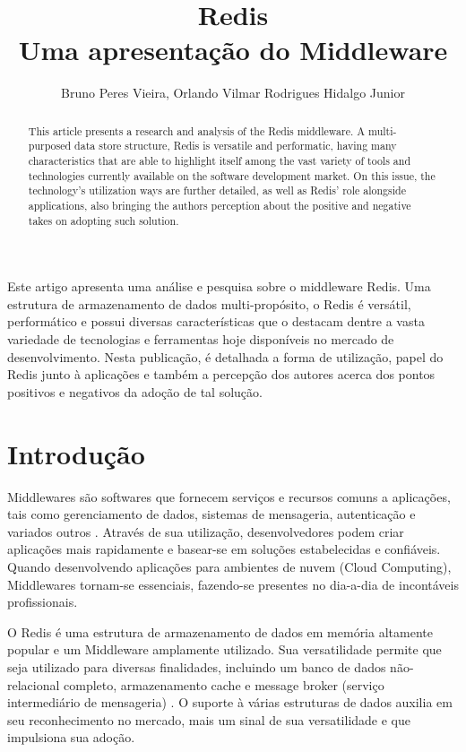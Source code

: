 \documentclass[12pt]{article}
\title{Redis\\Uma apresentação do Middleware}
\author{Bruno Peres Vieira\inst{1}, Orlando Vilmar Rodrigues Hidalgo Junior\inst{1} }
\begin{document}
 

\maketitle

\begin{abstract}
This article presents a research and analysis of the Redis middleware. A multi-purposed data store structure, Redis is versatile and performatic, having many characteristics that are able to highlight itself among the vast variety of tools and technologies currently available on the software development market. On this issue, the technology's utilization ways are further detailed, as well as Redis' role alongside applications, also bringing the authors perception about the positive and negative takes on adopting such solution.
\end{abstract}
     
\begin{resumo} 
Este artigo apresenta uma análise e pesquisa sobre o middleware Redis. Uma estrutura de armazenamento de dados multi-propósito, o Redis é versátil, performático e possui diversas características que o destacam dentre a vasta variedade de tecnologias e ferramentas hoje disponíveis no mercado de desenvolvimento. Nesta publicação, é detalhada a forma de utilização, papel do Redis junto à aplicações e também a percepção dos autores acerca dos pontos positivos e negativos da adoção de tal solução.
\end{resumo}


\section{Introdução}

Middlewares são softwares que fornecem serviços e recursos comuns a aplicações, tais como gerenciamento de dados, sistemas de mensageria, autenticação e variados outros \cite{redhat2020}. Através de sua utilização, desenvolvedores podem criar aplicações mais rapidamente e basear-se em soluções estabelecidas e confiáveis. Quando desenvolvendo aplicações para ambientes de nuvem (Cloud Computing), Middlewares tornam-se essenciais, fazendo-se presentes no dia-a-dia de incontáveis profissionais.

O Redis é uma estrutura de armazenamento de dados em memória altamente popular e um Middleware amplamente utilizado. Sua versatilidade permite que seja utilizado para diversas finalidades, incluindo um banco de dados não-relacional completo, armazenamento cache e message broker (serviço intermediário de mensageria) \cite{redis2020}. O suporte à várias estruturas de dados auxilia em seu reconhecimento no mercado, mais um sinal de sua versatilidade e que impulsiona sua adoção.
\end{document}
